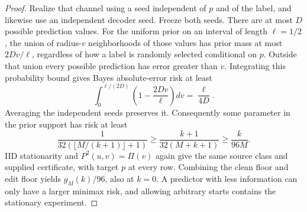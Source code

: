 \begin{proof}
Realize that channel using a seed independent of $p$ and of the label,
and likewise use an independent decoder seed. Freeze both seeds.
There are at most $D$ possible prediction values. For the uniform
prior on an interval of length $\ell=1/2$, the union of radius-$v$
neighborhoods of those values has prior mass at most $2Dv/\ell$,
regardless of how a label is randomly selected conditional on $p$.
Outside that union every possible prediction has error greater than
$v$. Integrating this probability bound gives Bayes absolute-error
risk at least
\[
 \int_0^{\ell/(2D)}\left(1-\frac{2Dv}{\ell}\right)dv
 =\frac\ell{4D}.
\]
Averaging the independent seeds preserves it. Consequently some
parameter in the prior support has risk at least
\[
 \frac1{32(\lfloor M/(k+1)\rfloor+1)}
 \ge\frac{k+1}{32(M+k+1)}\ge\frac{k}{96M}.
\]
IID stationarity and $P^2(u,v)=\Pi(v)$ again give the same source
class and supplied certificate, with target $p$ at every row. Combining
the clean floor and edit floor yields $g_M(k)/96$, also at $k=0$.
A predictor with less information can only have a larger minimax risk,
and allowing arbitrary starts contains the stationary experiment.
\end{proof}
